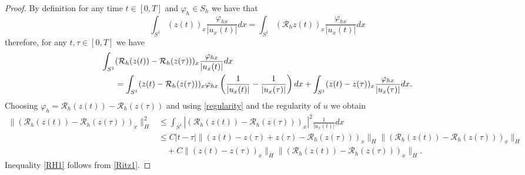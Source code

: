 \documentclass[a4paper,10pt]{article}
\numberwithin{equation}{section}
\begin{document}
\begin{proof}
By definition for any time $t \in [0,T]$ and $\varphi_{h} \in S_{h}$ we have that
$$\int_{S^{1}} (z(t))_{x} \frac{\varphi_{hx}}{|u_{x}(t)|} dx = \int_{S^{1}} ( \mathcal{R}_{h} z(t))_{x} \frac{\varphi_{hx}}{|u_{x}(t)|} dx $$
therefore, for any $t, \tau \in [0,T]$ we have
\begin{align}\label{start}
\int_{S^{1}}& (\mathcal{R}_{h} (z(t)) -\mathcal{R}_{h} (z(\tau)) )_{x} \frac{\varphi_{hx}}{|u_{x}(t)|}dx \\
&= \int_{S^{1}} (z(t) -\mathcal{R}_{h} (z(\tau)) )_{x} \varphi_{hx} \left(\frac{1}{|u_{x}(t)|} - \frac{1}{|u_{x}(\tau)|}\right)dx
+ \int_{S^{1}} (z(t) -z(\tau) )_{x} \frac{\varphi_{hx}}{|u_{x}(\tau)|}dx . \notag
\end{align}
Choosing $\varphi_{h}=\mathcal{R}_{h} (z(t)) -\mathcal{R}_{h} (z(\tau)) $ and using \eqref{regularity} and the regularity of $u$ we obtain
\begin{align*}
\| (\mathcal{R}_{h} (z(t)) -\mathcal{R}_{h} (z(\tau)) )_{x} \|_{H}^{2} &\leq
\int_{S^{1}} |(\mathcal{R}_{h} (z(t)) -\mathcal{R}_{h} (z(\tau)) )_{x}|^{2} \frac{1}{|u_{x}(t)|}dx \\
&\leq C |t -\tau|\| ( z(t) -z(\tau) + z(\tau) -\mathcal{R}_{h} (z(\tau)) )_{x} \|_{H} \| (\mathcal{R}_{h} (z(t)) -\mathcal{R}_{h} (z(\tau)) )_{x} \|_{H}\\
& \quad + C \| (z(t) -z(\tau) )_{x} \|_{H} \| (\mathcal{R}_{h} (z(t)) -\mathcal{R}_{h} (z(\tau)) )_{x} \|_{H}.
\end{align*}
Inequality \eqref{RH1} follows from \eqref{Ritz1}.


\end{proof}
\end{document}
